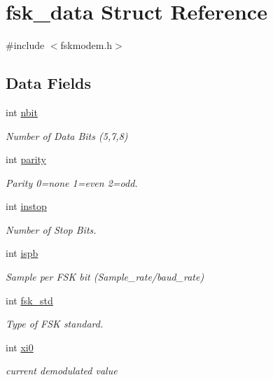 \hypertarget{structfsk__data}{}\section{fsk\+\_\+data Struct Reference}
\label{structfsk__data}


{\ttfamily \#include $<$fskmodem.\+h$>$}

\subsection*{Data Fields}
\begin{DoxyCompactItemize}
\item 
int \hyperlink{structfsk__data_a7d3b5ed8a33198ce8957052257f3ff8e}{nbit}
\begin{DoxyCompactList}\small\item\em Number of Data Bits (5,7,8) \end{DoxyCompactList}\item 
int \hyperlink{structfsk__data_afc8612ac1878ff9b31ea6dcf5e712faf}{parity}
\begin{DoxyCompactList}\small\item\em Parity 0=none 1=even 2=odd. \end{DoxyCompactList}\item 
int \hyperlink{structfsk__data_ae360946d35657de50d454a9f3e63ab8a}{instop}
\begin{DoxyCompactList}\small\item\em Number of Stop Bits. \end{DoxyCompactList}\item 
int \hyperlink{structfsk__data_a39a41190627091dd0d1e7e8eabb7c095}{ispb}
\begin{DoxyCompactList}\small\item\em Sample per F\+S\+K bit (Sample\+\_\+rate/baud\+\_\+rate) \end{DoxyCompactList}\item 
int \hyperlink{structfsk__data_a25f81eef1df67e4aa9e1e89b1df30ad9}{fsk\+\_\+std}
\begin{DoxyCompactList}\small\item\em Type of F\+S\+K standard. \end{DoxyCompactList}\item 
int \hyperlink{structfsk__data_a72049894f5994b79f90f8b9f41969cd2}{xi0}
\begin{DoxyCompactList}\small\item\em current demodulated value \end{DoxyCompactList}\item 

\end{DoxyCompactItemize}
